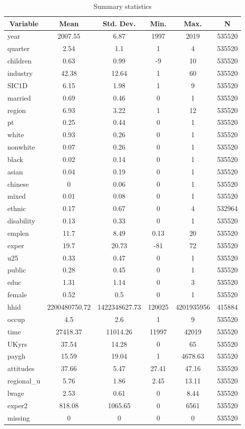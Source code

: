 
\begin{table}[htbp]\centering \caption{Summary statistics \label{sumstats}}
\begin{tabular}{l c c c c c}\hline\hline
\multicolumn{1}{c}{\textbf{Variable}} & \textbf{Mean}
 & \textbf{Std. Dev.}& \textbf{Min.} &  \textbf{Max.} & \textbf{N}\\ \hline
year & 2007.55 & 6.87 & 1997 & 2019 & 535520\\
quarter & 2.54 & 1.1 & 1 & 4 & 535520\\
children & 0.63 & 0.99 & -9 & 10 & 535520\\
industry & 42.38 & 12.64 & 1 & 60 & 535520\\
SIC1D & 6.15 & 1.98 & 1 & 9 & 535520\\
married & 0.69 & 0.46 & 0 & 1 & 535520\\
region & 6.93 & 3.22 & 1 & 12 & 535520\\
pt & 0.25 & 0.44 & 0 & 1 & 535520\\
white & 0.93 & 0.26 & 0 & 1 & 535520\\
nonwhite & 0.07 & 0.26 & 0 & 1 & 535520\\
black & 0.02 & 0.14 & 0 & 1 & 535520\\
asian & 0.04 & 0.19 & 0 & 1 & 535520\\
chinese & 0 & 0.06 & 0 & 1 & 535520\\
mixed & 0.01 & 0.08 & 0 & 1 & 535520\\
ethnic & 0.17 & 0.67 & 0 & 4 & 532964\\
disability & 0.13 & 0.33 & 0 & 1 & 535520\\
emplen & 11.7 & 8.49 & 0.13 & 20 & 535520\\
exper & 19.7 & 20.73 & -81 & 72 & 535520\\
u25 & 0.33 & 0.47 & 0 & 1 & 535520\\
public & 0.28 & 0.45 & 0 & 1 & 535520\\
educ & 1.31 & 1.14 & 0 & 3 & 535520\\
female & 0.52 & 0.5 & 0 & 1 & 535520\\
hhid & 2200480750.72 & 1422348627.73 & 120025 & 4201935956 & 415884\\
occup & 4.5 & 2.6 & 1 & 9 & 535520\\
time & 27418.37 & 11014.26 & 11997 & 42019 & 535520\\
UKyrs & 37.54 & 14.28 & 0 & 65 & 535520\\
paygh & 15.59 & 19.04 & 1 & 4678.63 & 535520\\
attitudes & 37.66 & 5.47 & 27.41 & 47.16 & 535520\\
regional\_u & 5.76 & 1.86 & 2.45 & 13.11 & 535520\\
lwage & 2.53 & 0.61 & 0 & 8.44 & 535520\\
exper2 & 818.08 & 1065.65 & 0 & 6561 & 535520\\
missing & 0 & 0 & 0 & 0 & 535520\\
\hline\end{tabular}
\label{tab:sumstats}
\end{table}
